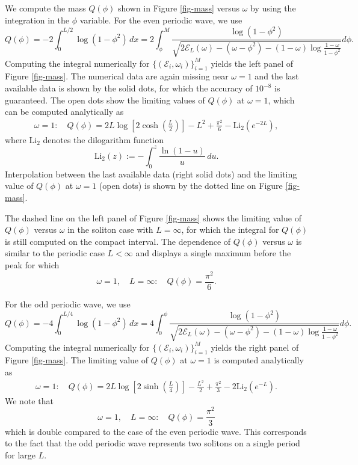 \documentclass[12pt,reqno]{amsart}
\numberwithin{equation}{section}
\numberwithin{figure}{section}
\begin{document}
We compute the mass $Q(\phi)$ shown in Figure \ref{fig-mass} versus $\omega$ by using the integration in the $\phi$ variable. For the even periodic wave, we use 
\begin{equation}
\label{Q-even}
Q (\phi) = - 2\int_{0}^{L/2} \log (1-\phi^2)\,dx = 2 \int^{M}_{\phi} \frac{\log(1-\phi^2)}{\sqrt{2\mathcal E_L(\omega) - (\omega - \phi^2) - (1-\omega)\log\frac{1-\omega}{1-\phi^2}}} d \phi.
\end{equation}
Computing the integral numerically for $\{ (\mathcal{E}_i,\omega_i)\}_{i = 1}^M$ 
yields the left panel of Figure \ref{fig-mass}. The numerical data are again 
missing near $\omega = 1$ and the last available data is shown by the solid dots, for which the accuracy of $10^{-8}$ is guaranteed. The open dots show the limiting 
values of $Q(\phi)$ at $\omega = 1$, which can be computed analytically as
\begin{align}
\label{Q-even-limit}
\omega = 1 : \quad Q(\phi) = 2L \log \left [2\cosh \left (\frac{L}{2}\right ) \right ] - L^2 + \frac{\pi^2}{6}  -  \mathrm{Li_2}(e^{-2L}), 
\end{align}
where $\mathrm{Li_2}$ denotes the dilogarithm function 
$$
\mathrm{Li_2}(z) := -\int_0^z \frac{\ln(1-u)}{u}\,du.
$$  
Interpolation between the last available data (right solid dots) and the limiting value of $Q(\phi)$ at $\omega = 1$ (open dots) is shown by the dotted line on Figure \ref{fig-mass}.

The dashed line on the left panel of Figure \ref{fig-mass} shows the limiting value of $Q(\phi)$ versus $\omega$ in the soliton case with $L = \infty$, for which the integral for $Q(\phi)$ is still computed on the compact interval. The dependence of $Q(\phi)$ versus $\omega$ is similar to the periodic case $L < \infty$ and displays a single maximum before the peak for which 
$$
\omega = 1, \quad L = \infty : \quad  Q(\phi) =  \frac{\pi^2}{6}.
$$

For the odd periodic wave, we use 
\begin{equation}
\label{Q-odd}
Q (\phi) = - 4\int_{0}^{L/4} \log (1-\phi^2)\,dx = 4 \int_0^{\phi} \frac{\log(1-\phi^2)}{\sqrt{2\mathcal E_L(\omega) - (\omega - \phi^2) - (1-\omega)\log\frac{1-\omega}{1-\phi^2}}} d \phi.
\end{equation}
Computing the integral numerically for $\{ (\mathcal{E}_i,\omega_i)\}_{i = 1}^M$ 
yields the right panel of Figure \ref{fig-mass}. The limiting 
value of $Q(\phi)$ at $\omega = 1$ is computed analytically as 
\begin{align}
\label{Q-odd-limit}
\omega = 1 : \quad Q(\phi) = 2L \log \left [2\sinh \left (\frac{L}{4}\right ) \right ] - \frac{L^2}{2} + \frac{\pi^2}{3}  -  2\mathrm{Li_2}(e^{-L}).
\end{align}
We note that 
$$
\omega = 1, \quad L = \infty : \quad  Q(\phi) =  \frac{\pi^2}{3}
$$
which is double compared to the case of the even periodic wave. This corresponds to the fact that the odd periodic wave represents two solitons on a single period for large $L$. 
\end{document}
